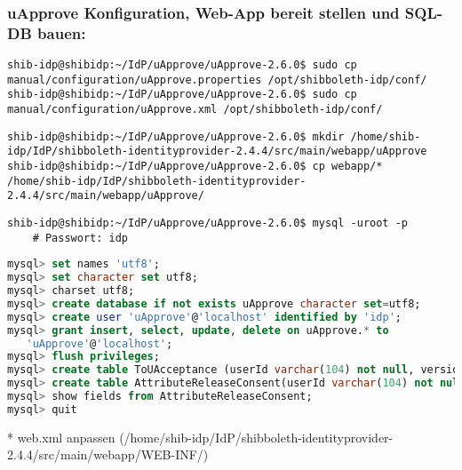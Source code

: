 \subsubsection*{uApprove Konfiguration, Web-App bereit stellen und SQL-DB
bauen:}
\begin{lstlisting}
shib-idp@shibidp:~/IdP/uApprove/uApprove-2.6.0$ sudo cp manual/configuration/uApprove.properties /opt/shibboleth-idp/conf/
shib-idp@shibidp:~/IdP/uApprove/uApprove-2.6.0$ sudo cp manual/configuration/uApprove.xml /opt/shibboleth-idp/conf/
\end{lstlisting}
\begin{lstlisting}
shib-idp@shibidp:~/IdP/uApprove/uApprove-2.6.0$ mkdir /home/shib-idp/IdP/shibboleth-identityprovider-2.4.4/src/main/webapp/uApprove
shib-idp@shibidp:~/IdP/uApprove/uApprove-2.6.0$ cp webapp/* /home/shib-idp/IdP/shibboleth-identityprovider-2.4.4/src/main/webapp/uApprove/
\end{lstlisting}
\begin{lstlisting}
shib-idp@shibidp:~/IdP/uApprove/uApprove-2.6.0$ mysql -uroot -p
	# Passwort: idp
\end{lstlisting}
\begin{lstlisting}[language=sql]
mysql> set names 'utf8';
mysql> set character set utf8;
mysql> charset utf8;
mysql> create database if not exists uApprove character set=utf8;
mysql> create user 'uApprove'@'localhost' identified by 'idp';
mysql> grant insert, select, update, delete on uApprove.* to
   'uApprove'@'localhost';
mysql> flush privileges;
mysql> create table ToUAcceptance (userId varchar(104) not null, version varchar(104) not null, fingerprint varchar(256) not null, acceptanceDate timestamp default current_timestamp not null, primary key (userId,version));
mysql> create table AttributeReleaseConsent(userId varchar(104) not null, relyingPartyId varchar(104) not null, attributeId varchar(104) not null, valuesHash varchar(256) not null, consentDate timestamp default current_timestamp not null, primary key (userId, relyingPartyId, attributeId));
mysql> show fields from AttributeReleaseConsent;
mysql> quit
\end{lstlisting}
* web.xml anpassen (/home/shib-idp/IdP/shibboleth-identityprovider-2.4.4/src/main/webapp/WEB-INF/)
